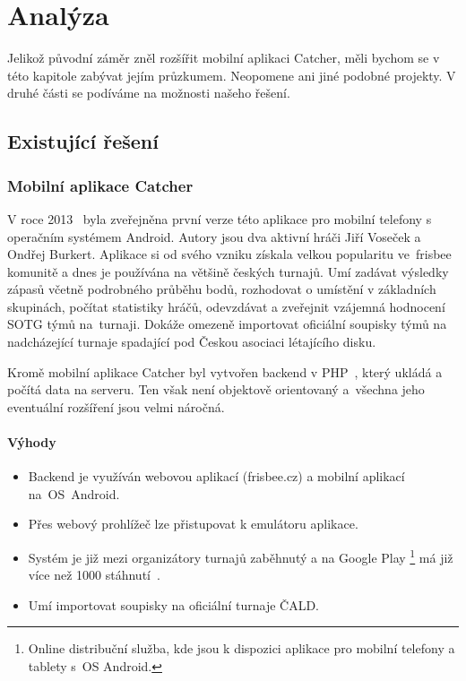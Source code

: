 \chapter{Analýza}

Jelikož původní záměr zněl rozšířit mobilní aplikaci Catcher,
měli bychom se v této kapitole zabývat jejím průzkumem. Neopomene ani jiné podobné projekty.
V druhé části se podíváme na možnosti našeho řešení.

\section{Existující řešení}

\subsection*{Mobilní aplikace Catcher}

V roce 2013~\cite{cald_catcher} byla zveřejněna první verze této aplikace pro mobilní telefony s operačním systémem Android.
Autory jsou dva aktivní hráči Jiří Voseček a Ondřej Burkert. Aplikace si od svého vzniku získala velkou popularitu
ve~frisbee komunitě a dnes je používána na většině českých turnajů. Umí zadávat výsledky
zápasů včetně podrobného průběhu bodů, rozhodovat o umístění v základních skupinách, počítat statistiky hráčů,
odevzdávat a zveřejnit vzájemná hodnocení SOTG týmů na~turnaji. Dokáže omezeně importovat oficiální soupisky týmů
na nadcházející turnaje spadající pod Českou asociaci létajícího disku.

Kromě mobilní aplikace Catcher byl vytvořen backend v PHP~\cite{php}, který ukládá a počítá data na serveru. Ten však není
objektově orientovaný a~všechna jeho eventuální rozšíření jsou velmi náročná.

\subsubsection*{Výhody}
\begin{itemize}
  \item Backend je využíván webovou aplikací (frisbee.cz) a mobilní aplikací na~OS~Android.
  \item Přes webový prohlížeč lze přistupovat k emulátoru aplikace.
  \item Systém je již mezi organizátory turnajů zaběhnutý a na Google Play
    \footnote{Online distribuční služba, kde jsou k dispozici aplikace pro mobilní telefony a tablety s~OS Android.}
    má již více než 1000 stáhnutí~\cite{catcher_play}.
  \item Umí importovat soupisky na oficiální turnaje ČALD.
\end{itemize}

